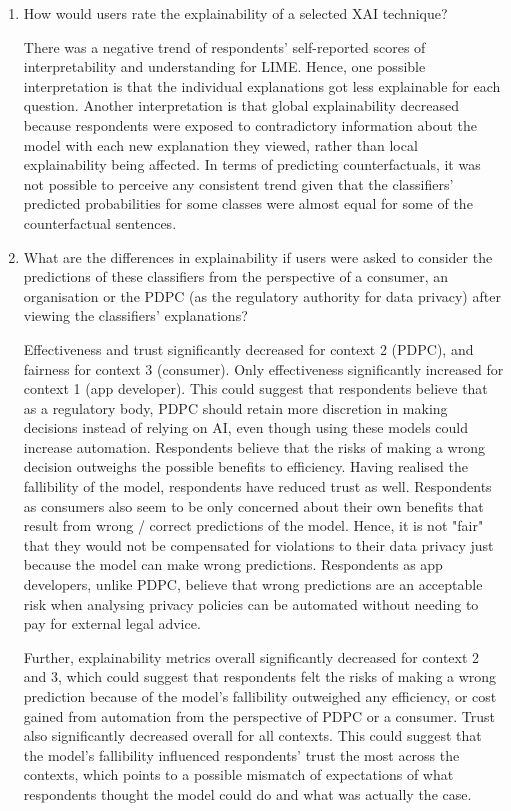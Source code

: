 \begin{enumerate}
    \item How would users rate the explainability of a selected XAI technique?
    
    There was a negative trend of respondents' self-reported scores of interpretability and understanding for LIME. Hence, one possible interpretation is that the individual explanations got less explainable for each question. Another interpretation is that global explainability decreased because respondents were exposed to contradictory information about the model with each new explanation they viewed, rather than local explainability being affected. In terms of predicting counterfactuals, it was not possible to perceive any consistent trend given that the classifiers' predicted probabilities for some classes were almost equal for some of the counterfactual sentences. 

    \item What are the differences in explainability if users were asked to consider the predictions of these classifiers from the perspective of a consumer, an organisation or the PDPC (as the regulatory authority for data privacy) after viewing the classifiers' explanations?
    
    Effectiveness and trust significantly decreased for context 2 (PDPC), and fairness for context 3 (consumer). Only effectiveness significantly increased for context 1 (app developer). This could suggest that respondents believe that as a regulatory body, PDPC should retain more discretion in making decisions instead of relying on AI, even though using these models could increase automation. Respondents believe that the risks of making a wrong decision outweighs the possible benefits to efficiency. Having realised the fallibility of the model, respondents have reduced trust as well. Respondents as consumers also seem to be only concerned about their own benefits that result from wrong / correct predictions of the model. Hence, it is not "fair" that they would not be compensated for violations to their data privacy just because the model can make wrong predictions. Respondents as app developers, unlike PDPC, believe that wrong predictions are an acceptable risk when analysing privacy policies can be automated without needing to pay for external legal advice.

    Further, explainability metrics overall significantly decreased for context 2 and 3, which could suggest that respondents felt the risks of making a wrong prediction because of the model's fallibility outweighed any efficiency, or cost gained from automation from the perspective of PDPC or a consumer. Trust also significantly decreased overall for all contexts. This could suggest that the model's fallibility influenced respondents' trust the most across the contexts, which points to a possible mismatch of expectations of what respondents thought the model could do and what was actually the case. 
\end{enumerate}


